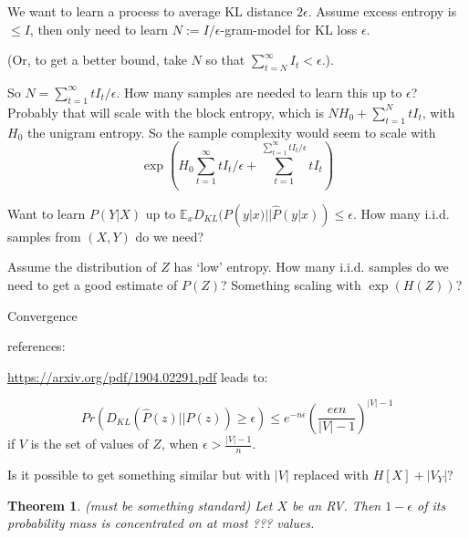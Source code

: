 \documentclass[11pt,letterpaper]{article}
\newcounter{theorem}
\newtheorem{thm}[theorem]{Theorem}
\begin{document}
We want to learn a process to average KL distance $2\epsilon$.
Assume excess entropy is $\leq I$, then only need to learn $N := I/\epsilon$-gram-model for KL loss $\epsilon$.

(Or, to get a better bound, take $N$ so that $\sum_{t=N}^\infty I_t < \epsilon$.).

So $N = \sum_{t=1}^\infty t I_t/\epsilon$.
How many samples are needed to learn this up to $\epsilon$? Probably that will scale with the block entropy, which is $N H_0 + \sum_{t=1}^N t I_t$, with $H_0$ the unigram entropy.
So the sample complexity would seem to scale with
$$\exp\left(H_0 \sum_{t=1}^\infty t I_t/\epsilon + \sum_{t=1}^{\sum_{t=1}^\infty t I_t/\epsilon} t I_t\right)$$


Want to learn $P(Y|X)$ up to $\mathbb{E}_x D_{KL}(P(y|x)||\hat P(y|x)) \leq \epsilon$.
How many i.i.d. samples from $(X,Y)$ do we need?

Assume the distribution of $Z$ has `low' entropy.
How many i.i.d. samples do we need to get a good estimate of $P(Z)$?
Something scaling with $\exp(H(Z))$?

Convergence

references:

\url{https://arxiv.org/pdf/1904.02291.pdf} leads to:

$$Pr(D_{KL}(\hat P(z)||P(z)) \geq \epsilon) \leq e^{-n\epsilon} \left(\frac{e\epsilon n}{|V|-1}\right)^{|V|-1}$$
if $V$ is the set of values of $Z$, when $\epsilon > \frac{|V|-1}{n}$.


Is it possible to get something similar but with $|V|$ replaced with $H[X]+|V_Y|$?

\begin{thm}(must be something standard)
Let $X$ be an RV. Then $1-\epsilon$ of its probability mass is concentrated on at most
???
values.
\end{thm}
\end{document}
